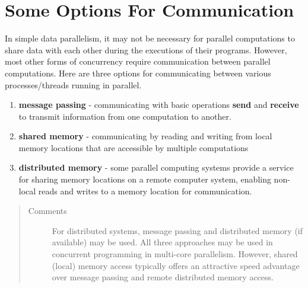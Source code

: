 \documentclass[letterpaper,10pt,english]{sphinxmanual}
\begin{document}
\chapter{Some Options For Communication}
\label{OptionsForCommunication/OptionsForCommunication::doc}\label{OptionsForCommunication/OptionsForCommunication:some-options-for-communication}
In simple data parallelism, it may not be necessary for parallel computations to share data with each other during the executions of their programs. However, most other forms of concurrency require communication between parallel computations.  Here are three options for communicating between various processes/threads running in parallel.
\begin{enumerate}
\item {} 
\textbf{message passing} - communicating with basic operations \textbf{send} and \textbf{receive} to transmit information from one computation to another.

\item {} 
\textbf{shared memory} - communicating by reading and writing from local memory locations that are accessible by multiple computations

\item {} 
\textbf{distributed memory} - some parallel computing systems provide a service for sharing memory locations on a remote computer system, enabling non-local reads and writes to a memory location for communication.

\end{enumerate}
\begin{quote}\begin{description}
\item[{Comments}] \leavevmode
For distributed systems, message passing and distributed memory (if available) may be used. All three approaches may be used in concurrent programming in multi-core parallelism. However, shared (local) memory access typically offers an attractive speed advantage over message passing and remote distributed memory access.

\end{description}\end{quote}
\end{document}
